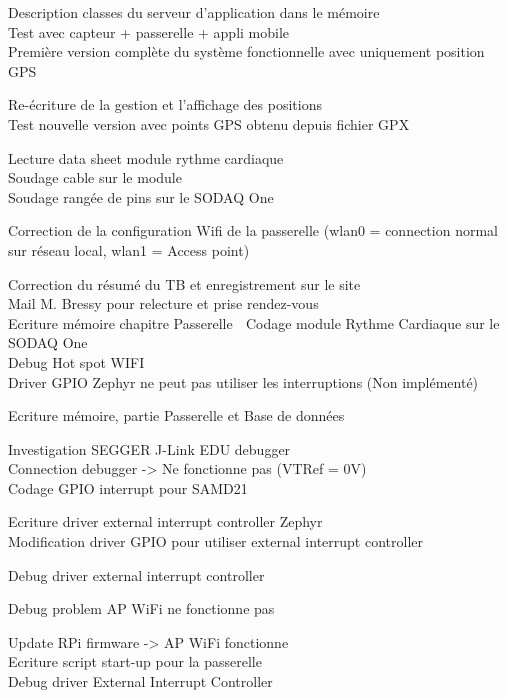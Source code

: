 \begin{multicols}{2}
Description classes du serveur d’application dans le mémoire\\
Test avec capteur + passerelle + appli mobile\\
Première version complète du système fonctionnelle avec uniquement position GPS

Re-écriture de la gestion et l’affichage des positions\\
Test nouvelle version avec points GPS obtenu depuis fichier GPX

Lecture data sheet module rythme cardiaque\\
Soudage cable sur le module\\
Soudage rangée de pins sur le SODAQ One

Correction de la configuration Wifi de la passerelle (wlan0 = connection normal sur réseau local, wlan1 = Access point)

Correction du résumé du TB et enregistrement sur le site\\
Mail M. Bressy pour relecture et prise rendez-vous\\
Ecriture mémoire chapitre Passerelle

Codage module Rythme Cardiaque sur le SODAQ One\\
Debug Hot spot WIFI\\
Driver GPIO Zephyr ne peut pas utiliser les interruptions (Non implémenté)

Ecriture mémoire, partie Passerelle et Base de données

Investigation SEGGER J-Link EDU debugger\\
Connection debugger -> Ne fonctionne pas (VTRef = 0V)\\
Codage GPIO interrupt pour SAMD21

Ecriture driver external interrupt controller Zephyr\\
Modification driver GPIO pour utiliser external interrupt controller

Debug driver external interrupt controller

Debug problem AP WiFi ne fonctionne pas

Update RPi firmware -> AP WiFi fonctionne\\
Ecriture script start-up pour la passerelle\\
Debug driver External Interrupt Controller


\end{multicols}
